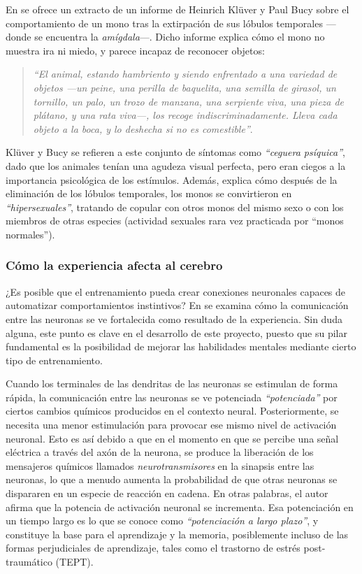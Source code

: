 En \cite{LeDoux1996} se ofrece un extracto de un informe de Heinrich Klüver y Paul Bucy sobre el comportamiento de un mono tras la extirpación de sus lóbulos temporales ---donde se encuentra la {\it amígdala}---. Dicho informe explica cómo el mono no muestra ira ni miedo, y parece incapaz de reconocer objetos:

\begin{quote}
{\it ``El animal, estando hambriento y siendo enfrentado a una variedad de objetos ---un peine, una perilla de baquelita, una semilla de girasol, un tornillo, un palo, un trozo de manzana, una serpiente viva, una pieza de plátano, y una rata viva---, los recoge indiscriminadamente. Lleva cada objeto a la boca, y lo deshecha si no es comestible''}.
\end{quote}

Klüver y Bucy se refieren a este conjunto de síntomas como {\it ``ceguera psíquica''}, dado que los animales tenían una agudeza visual perfecta, pero eran ciegos a la importancia psicológica de los estímulos. Además, \cite{LeDoux1996} explica cómo después de la eliminación de los lóbulos temporales, los monos se convirtieron en {\it ``hipersexuales''}, tratando de copular con otros monos del mismo sexo o con los miembros de otras especies (actividad sexuales rara vez practicada por ``monos normales'').


\subsubsection{Cómo la experiencia afecta al cerebro}

¿Es posible que el entrenamiento pueda crear conexiones neuronales capaces de automatizar comportamientos instintivos? En \cite{Sapolsky} se examina cómo la comunicación entre las neuronas se ve fortalecida como resultado de la experiencia. Sin duda alguna, este punto es clave en el desarrollo de este proyecto, puesto que su pilar fundamental es la posibilidad de mejorar las habilidades mentales mediante cierto tipo de entrenamiento.

Cuando los terminales de las dendritas de las neuronas se estimulan de forma rápida, la comunicación entre las neuronas se ve potenciada {\it ``potenciada''} por ciertos cambios químicos producidos en el contexto neural. Posteriormente, se necesita una menor estimulación para provocar ese mismo nivel de activación neuronal. Esto es así debido a que en el momento en que se percibe una señal eléctrica a través del axón de la neurona, se produce la liberación de los mensajeros químicos llamados {\it neurotransmisores}  en la sinapsis entre las neuronas, lo que a menudo aumenta la probabilidad de que otras neuronas se dispararen en un especie de reacción en cadena. En otras palabras, el autor afirma que la potencia de activación neuronal se incrementa. Esa potenciación en un tiempo largo es lo que se conoce como {\it ``potenciación a largo plazo''}, y constituye la base para el aprendizaje y la memoria, posiblemente incluso de las formas perjudiciales de aprendizaje, tales como el trastorno de estrés post-traumático (TEPT).

